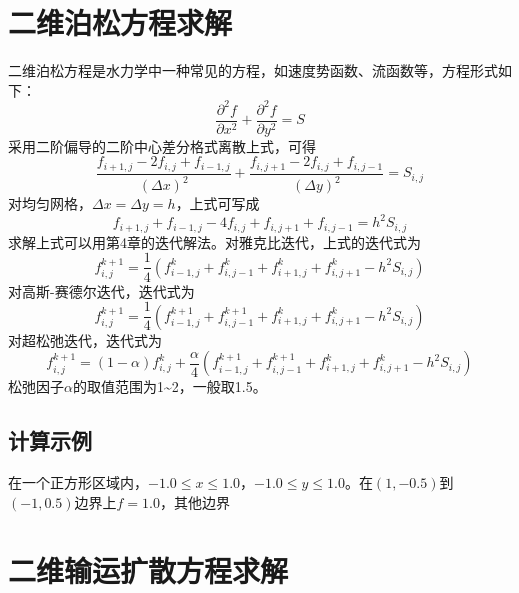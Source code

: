 \section{二维泊松方程求解}
二维泊松方程是水力学中一种常见的方程，如速度势函数、流函数等，方程形式如下：
\begin{equation}
  \frac{\partial^{2} f}{\partial x^{2}} +
  \frac{\partial^{2} f}{\partial y^{2}}
  =
  S
\end{equation}
采用二阶偏导的二阶中心差分格式离散上式，可得
\begin{equation}
  \frac{f_{i+1,j} - 2f_{i, j} + f_{i-1,j}}{(\Delta x)^{2}} +
  \frac{f_{i,j+1} - 2f_{i, j} + f_{i,j-1}}{(\Delta y)^{2}} 
  =
  S_{i,j}
\end{equation}
对均匀网格，$\Delta x=\Delta y=h$，上式可写成
\begin{equation}
  f_{i+1, j} + f_{i-1,j } - 4f_{i,j} + f_{i, j+1} + f_{i, j-1} = h^{2}S_{i,j}
\end{equation}
求解上式可以用第4章的迭代解法。对雅克比迭代，上式的迭代式为
\begin{equation}
  f_{i, j}^{k+1} = 
\frac{1}{4}(f_{i-1,j }^{k} + f_{i, j-1}^{k} + f_{i+1, j}^{k} + f_{i, j+1}^{k}  - h^{2}S_{i,j})
\end{equation}
对高斯-赛德尔迭代，迭代式为
\begin{equation}
  f_{i, j}^{k+1} = 
\frac{1}{4}(f_{i-1,j }^{k+1} + f_{i, j-1}^{k+1} + f_{i+1, j}^{k} + f_{i, j+1}^{k}  - h^{2}S_{i,j})
\end{equation}
对超松弛迭代，迭代式为
\begin{equation}
  f_{i, j}^{k+1} = 
  (1-\alpha)f_{i, j}^{k}+
  \frac{\alpha}{4}(f_{i-1,j }^{k+1} + f_{i, j-1}^{k+1} + f_{i+1, j}^{k} + f_{i, j+1}^{k}  - h^{2}S_{i,j})
\end{equation}
松弛因子$\alpha$的取值范围为1\textasciitilde 2，一般取1.5。
\subsection{计算示例}
在一个正方形区域内，$-1.0 \le x \le 1.0$，$-1.0 \le y \le 1.0$。在$(1,-0.5)$到
$(-1,0.5)$边界上$f=1.0$，其他边界
\section{二维输运扩散方程求解}

